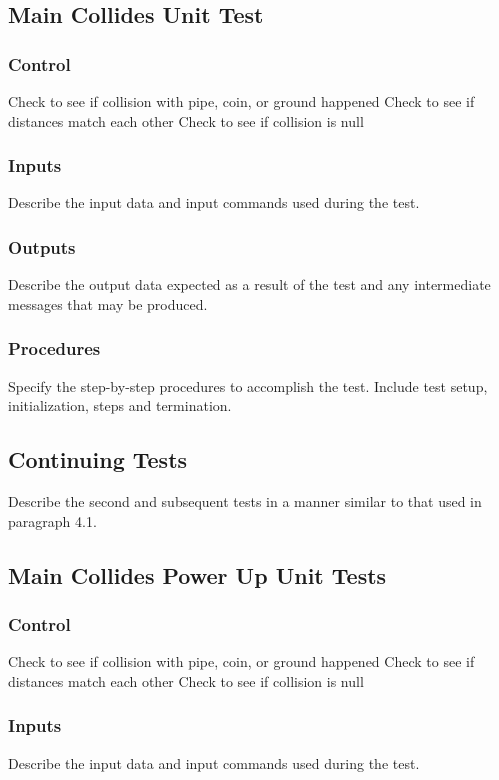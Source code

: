 \documentclass[11pt, oneside]{article}   	%
\begin{document}
\subsection{Main Collides Unit Test}
\subsubsection{Control}
Check to see if collision with pipe, coin, or ground happened
Check to see if distances match each other
Check to see if collision is null

\subsubsection{Inputs}
Describe the input data and input commands used during the test.

\subsubsection{Outputs}
Describe the output data expected as a result of the test and any intermediate messages that may be produced.

\subsubsection{Procedures}
Specify the step-by-step procedures to accomplish the test. Include test setup, initialization, steps and termination.

\subsection{Continuing Tests}
Describe the second and subsequent tests in a manner similar to that used in paragraph 4.1.

\subsection{Main Collides Power Up Unit Tests}
\subsubsection{Control}
Check to see if collision with pipe, coin, or ground happened
Check to see if distances match each other
Check to see if collision is null

\subsubsection{Inputs}
Describe the input data and input commands used during the test.
\end{document}
